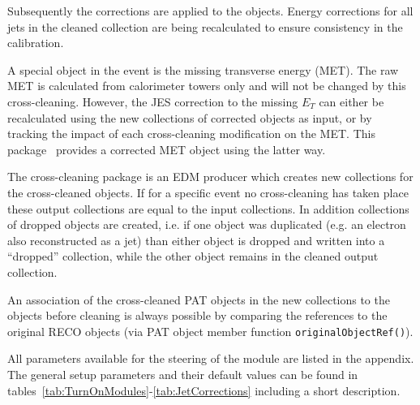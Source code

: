 \documentclass{cmspaper}
\begin{document}

Subsequently the corrections are applied to the objects. Energy corrections for
all jets in the cleaned collection are being recalculated to ensure consistency
in the calibration.

A special object in the event is the missing transverse energy (MET). The raw
MET is calculated from calorimeter towers only and will not be changed by this
cross-cleaning. However, the JES correction to the missing $E_T$ can either be
recalculated using the new collections of corrected objects as input, or by
tracking the impact of each cross-cleaning modification on the MET. This
package~\cite{package} provides a corrected MET object using the latter way.

The cross-cleaning package is an EDM producer which creates new collections for
the cross-cleaned objects. If for a specific event no cross-cleaning has taken
place these output collections are equal to the input collections.
In addition collections of dropped objects are created, i.e. if one object was
duplicated (e.g. an electron also reconstructed as a jet) than either
object is dropped and written into a ``dropped'' collection, while the other
object remains in the cleaned output collection.

An association of the cross-cleaned PAT objects in the new collections to the
objects before cleaning is always possible by comparing the references to the
original RECO objects (via PAT object member function
\texttt{originalObjectRef()}). 


All parameters available for the steering of the module are listed in the
appendix. The general setup parameters and their default values can be found in
tables~\ref{tab:TurnOnModules}-\ref{tab:JetCorrections} including a short
description.
\end{document}
